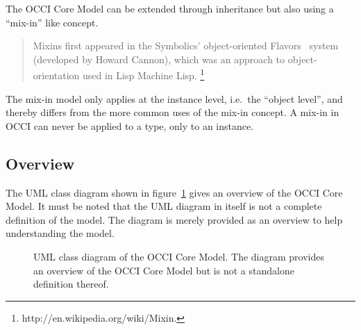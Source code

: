 \documentclass[10pt,a4paper]{article}
\begin{document}
The OCCI Core Model can be extended through inheritance but also
using a ``mix-in'' like concept.

\begin{quote}
  Mixins first appeared in the Symbolics' object-oriented
  Flavors~\cite{Moon:1986:flavors} system (developed by Howard
  Cannon), which was an approach to object-orientation used in Lisp
  Machine Lisp. \footnote{http://en.wikipedia.org/wiki/Mixin.}
\end{quote}

The mix-in model only applies at the instance level, i.e.~the ``object
level'', and thereby differs from the more common uses of the mix-in
concept. A mix-in in OCCI can never be applied to a type, only to an
instance.

\subsection{Overview}

The UML class diagram shown in figure~\ref{fig:occi_model} gives an
overview of the OCCI Core Model. It must be noted that the UML diagram
in itself is not a complete definition of the model. The diagram is
merely provided as an overview to help understanding the model.

\begin{figure}[!h]
  {\centering {} \par}
  \caption{UML class diagram of the OCCI Core Model. The diagram
    provides an overview of the OCCI Core Model but is not a
    standalone definition thereof.}
  \label{fig:occi_model}
\end{figure}
\end{document}
